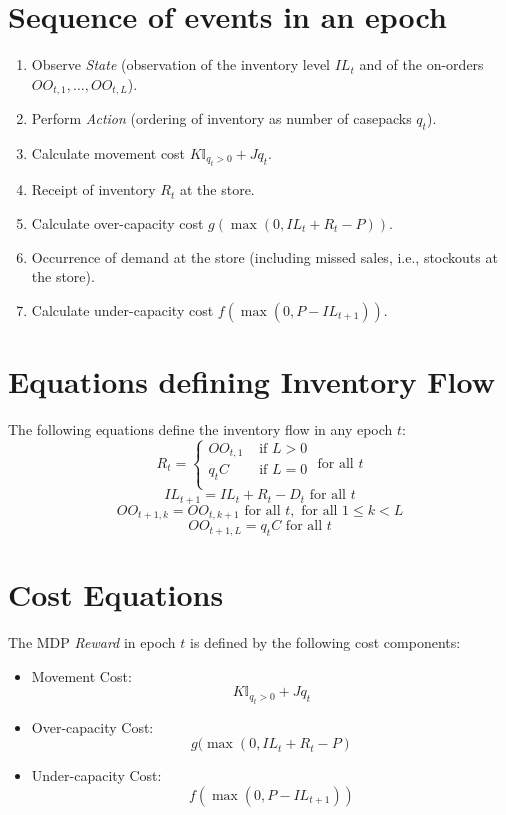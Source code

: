 \documentclass[12pt]{amsart}
\begin{document}
\section{Sequence of events in an epoch}

\begin{enumerate}
\item Observe {\em State} (observation of the inventory level $IL_t$  and of the on-orders $OO_{t,1}, \ldots, OO_{t,L}$).
\item Perform {\em Action} (ordering of inventory as number of casepacks $q_t$).
\item Calculate movement cost  $K \mathbb{I}_{q_t > 0} + J q_t$.
\item Receipt of inventory $R_t$ at the store.
\item Calculate over-capacity cost $g(\max(0, IL_t + R_t - P))$.
\item Occurrence of demand at the store (including missed sales, i.e., stockouts at the store).
\item Calculate under-capacity cost $f(\max(0, P - IL_{t+1}))$.
\end{enumerate}

\section{Equations defining Inventory Flow}
The following equations define the inventory flow in any epoch $t$:
$$R_t =
\begin{cases}
OO_{t,1} & \text{ if } L > 0\\
q_t C & \text{ if } L = 0\\
\end{cases}
\mbox{ for all } t$$
$$IL_{t+1} = IL_{t} + R_t - D_t \mbox{ for all } t$$
$$OO_{t+1,k} = OO_{t,k+1} \mbox{ for all } t, \mbox{ for all } 1 \leq k < L$$
$$OO_{t+1,L} = q_t C  \mbox{ for all } t$$

\section{Cost Equations}
The MDP {\em Reward} in epoch $t$ is defined by the following cost components:
\begin{itemize}
\item Movement Cost:
$$K \mathbb{I}_{q_t > 0} + J q_t$$
\item Over-capacity Cost:
$$ g(\max(0, IL_t + R_t -  P)$$ 
\item Under-capacity Cost:
$$f(\max(0, P - IL_{t+1}))$$
\end{itemize}
\end{document}
